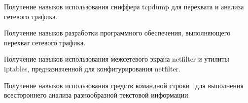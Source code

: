
Получение навыков использования сниффера tcpdump для перехвата и анализа сетевого трафика.

Получение навыков разработки программного обеспечения, выполняющего перехват сетевого трафика.

Получение навыков использования межсетевого экрана netfilter и утилиты iptables,
предназначенной для конфигурирования netfilter.

Получение навыков использования средств командной строки \linux\ для выполнения всестороннего анализа
разнообразной текстовой информации.

